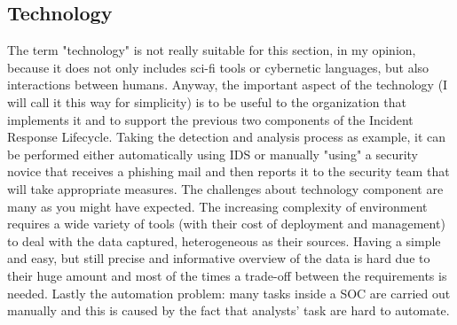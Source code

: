 \subsection{Technology}
The term "technology" is not really suitable for this section, in my opinion, because it does not only includes sci-fi tools or cybernetic languages, but also interactions between humans. Anyway, the important aspect of the technology (I will call it this way for simplicity) is to be useful to the organization that implements it and to support the previous two components of the Incident Response Lifecycle. Taking the detection and analysis process as example, it can be performed either automatically using IDS or manually "using" a security novice that receives a phishing mail and then reports it to the security team that will take appropriate measures. The challenges about technology component are many as you might have expected. The increasing complexity of environment requires a wide variety of tools (with their cost of deployment and management) to deal with the data captured, heterogeneous as their sources. Having a simple and easy, but still precise and informative overview of the data is hard due to their huge amount and most of the times a trade-off between the requirements is needed. Lastly the automation problem: many tasks inside a SOC are carried out manually and this is caused by the fact that analysts' task are hard to automate.
